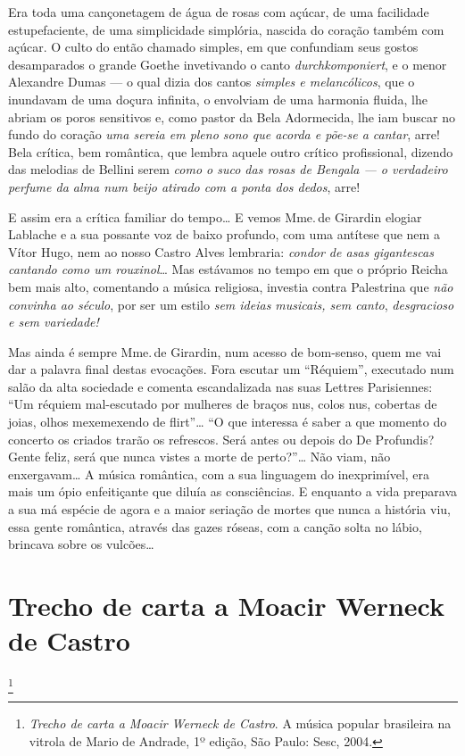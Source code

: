 Era toda uma cançonetagem de água de rosas com açúcar, de uma facilidade
estupefaciente, de uma simplicidade simplória, nascida do coração também
com açúcar. O culto do então chamado simples, em que confundiam seus
gostos desamparados o grande Goethe invetivando o canto
\textit{durchkomponiert}, e o menor Alexandre Dumas --- o qual dizia dos
cantos \textit{simples e melancólicos}, que o inundavam de uma doçura
infinita, o envolviam de uma harmonia fluida, lhe abriam os poros
sensitivos e, como pastor da Bela Adormecida, lhe iam buscar no fundo do
coração \textit{uma sereia em pleno sono que acorda e põe-se a cantar}, arre!
Bela crítica, bem romântica, que lembra aquele outro crítico
profissional, dizendo das melodias de Bellini serem \textit{como o suco das
rosas de Bengala --- o verdadeiro perfume da alma num beijo atirado com a
ponta dos dedos}, arre!

E assim era a crítica familiar do tempo\ldots{} E vemos Mme.\,de Girardin
elogiar Lablache e a sua possante voz de baixo profundo, com uma
antítese que nem a Vítor Hugo, nem ao nosso Castro Alves lembraria:
\textit{condor de asas gigantescas cantando como um rouxinol}\ldots{} Mas
estávamos no tempo em que o próprio Reicha bem mais alto, comentando a
música religiosa, investia contra Palestrina que \textit{não convinha ao
século}, por ser um estilo \textit{sem ideias musicais, sem canto},
\textit{desgracioso e sem variedade!}

Mas ainda é sempre Mme.\,de Girardin, num acesso de bom-senso, quem me
vai dar a palavra final destas evocações. Fora escutar um ``Réquiem'',
executado num salão da alta sociedade e comenta escandalizada nas suas
Lettres Parisiennes: ``Um réquiem mal-escutado por mulheres de braços
nus, colos nus, cobertas de joias, olhos mexemexendo de flirt''\ldots{} ``O
que interessa é saber a que momento do concerto os criados trarão os
refrescos. Será antes ou depois do De Profundis? Gente feliz, será que
nunca vistes a morte de perto?''\ldots{} Não viam, não enxergavam\ldots{} A música
romântica, com a sua linguagem do inexprimível, era mais um ópio
enfeitiçante que diluía as consciências. E enquanto a vida preparava a
sua má espécie de agora e a maior seriação de mortes que nunca a
história viu, essa gente romântica, através das gazes róseas, com a
canção solta no lábio, brincava sobre os vulcões\ldots{}


\chapter{Trecho de carta a Moacir Werneck de Castro}\footnote{\textit{Trecho de carta a Moacir Werneck de Castro}. A música popular brasileira na vitrola de Mario de Andrade, 1º edição, São Paulo: Sesc, 2004.}

